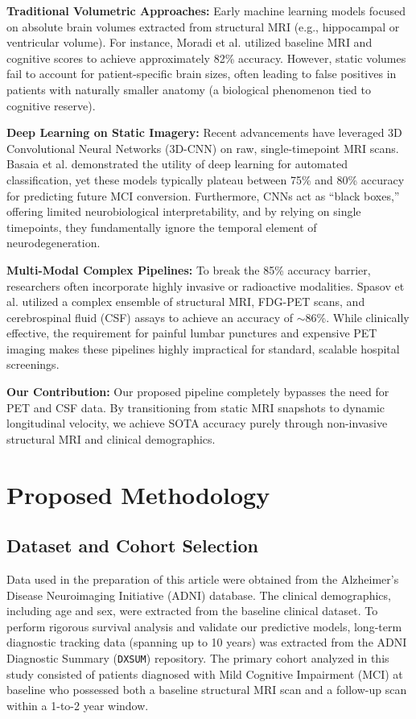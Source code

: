 \documentclass[11pt, a4paper]{article}
\begin{document}
\textbf{Traditional Volumetric Approaches:} Early machine learning models focused on absolute brain volumes extracted from structural MRI (e.g., hippocampal or ventricular volume). For instance, Moradi et al. utilized baseline MRI and cognitive scores to achieve approximately 82\% accuracy. However, static volumes fail to account for patient-specific brain sizes, often leading to false positives in patients with naturally smaller anatomy (a biological phenomenon tied to cognitive reserve).

\textbf{Deep Learning on Static Imagery:} Recent advancements have leveraged 3D Convolutional Neural Networks (3D-CNN) on raw, single-timepoint MRI scans. Basaia et al. demonstrated the utility of deep learning for automated classification, yet these models typically plateau between 75\% and 80\% accuracy for predicting future MCI conversion. Furthermore, CNNs act as ``black boxes,'' offering limited neurobiological interpretability, and by relying on single timepoints, they fundamentally ignore the temporal element of neurodegeneration.

\textbf{Multi-Modal Complex Pipelines:} To break the 85\% accuracy barrier, researchers often incorporate highly invasive or radioactive modalities. Spasov et al. utilized a complex ensemble of structural MRI, FDG-PET scans, and cerebrospinal fluid (CSF) assays to achieve an accuracy of $\sim$86\%. While clinically effective, the requirement for painful lumbar punctures and expensive PET imaging makes these pipelines highly impractical for standard, scalable hospital screenings.

\textbf{Our Contribution:} Our proposed pipeline completely bypasses the need for PET and CSF data. By transitioning from static MRI snapshots to dynamic longitudinal velocity, we achieve SOTA accuracy purely through non-invasive structural MRI and clinical demographics.

\section{Proposed Methodology}

\subsection{Dataset and Cohort Selection}
Data used in the preparation of this article were obtained from the Alzheimer's Disease Neuroimaging Initiative (ADNI) database. The clinical demographics, including age and sex, were extracted from the baseline clinical dataset. To perform rigorous survival analysis and validate our predictive models, long-term diagnostic tracking data (spanning up to 10 years) was extracted from the ADNI Diagnostic Summary (\texttt{DXSUM}) repository. The primary cohort analyzed in this study consisted of patients diagnosed with Mild Cognitive Impairment (MCI) at baseline who possessed both a baseline structural MRI scan and a follow-up scan within a 1-to-2 year window. 
\end{document}
